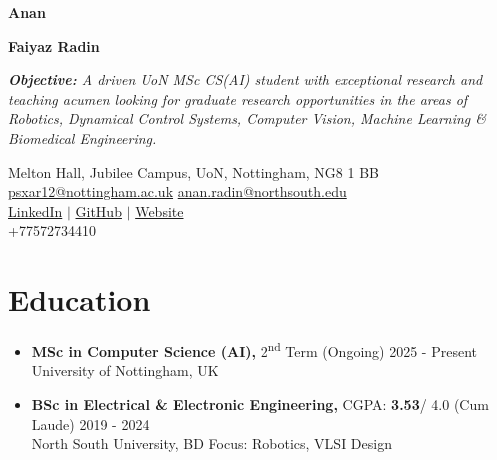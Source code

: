 \documentclass[11pt,a4paper]{article}
\newcommand{\name}[1]{
  {\Huge\color{namecolor}\textbf{#1}}
}
\newcommand{\nameblack}[1]{%
  {\Huge\color{black}\textbf{#1}}%
}
\newcommand{\tagline}[1]{
  \textit{#1}
}
\begin{document}


\noindent
\begin{minipage}[t]{0.65\textwidth}
  \name{Anan}
\nameblack{Faiyaz Radin}


  \vspace{0.3cm}
  \tagline{{\textbf{Objective: }}A driven UoN MSc CS(AI) student with exceptional research and teaching acumen looking for graduate research opportunities in the areas of Robotics, Dynamical Control Systems, Computer Vision, Machine Learning \& Biomedical Engineering.}
  \end{minipage}
\hfill
\begin{minipage}[t]{0.3\textwidth}
\vspace{0.15cm}
  \raggedleft
  {\footnotesize
    Melton Hall, Jubilee Campus, UoN, Nottingham, NG8 1 BB \\
    \href{mailto:psxar12@nottingham.ac.uk}{psxar12@nottingham.ac.uk}
    \href{mailto:anan.radin@northsouth.edu}{anan.radin@northsouth.edu} \\
    \href{https://www.linkedin.com/in/ananfaiyaz/}{LinkedIn} $\mid$
    \href{https://github.com/xylomylo}{GitHub} $\mid$
    \href{https://xylomylo.github.io}{Website} \\
    +77572734410
  }
\end{minipage}

\vspace{0.05cm}

\section*{Education}

\begin{itemize}
  \item
 \textbf{MSc in Computer Science (AI),}
  \hspace{2.19cm}
  \textbullet{} 2\textsuperscript{nd} Term (Ongoing)
  \hfill {\footnotesize 2025 - Present} \\
  {University of Nottingham, UK}
  
  \item 
  \textbf{BSc in Electrical \& Electronic Engineering,} 
  \hspace{0.06cm}
  \textbullet{} CGPA: \textbf{3.53}/ 4.0 (Cum Laude) 
  \hfill {\footnotesize 2019 - 2024} \\
  {North South University, BD}
  \hspace{3.37cm}
  {Focus:} Robotics, VLSI Design
  
\end{itemize}
\end{document}
